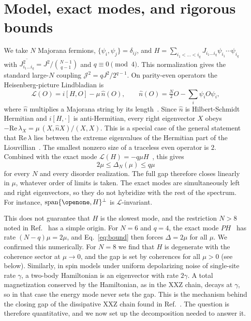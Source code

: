 \documentclass[aps,pre,twocolumn,superscriptaddress,amsmath,amssymb,10pt]{revtex4-2}
\newcommand{\Lc}{\mathcal{L}}
\newcommand{\J}{\mathcal{J}}
\begin{document}
\section{Model, exact modes, and rigorous bounds}

We take $N$ Majorana fermions, $\{\psi_i,\psi_j\}=\delta_{ij}$, and $H=\sum_{i_1<\dots<i_q}J_{i_1\dots i_q}\psi_{i_1}\cdots\psi_{i_q}$ with $\overline{J^2_{i_1\dots i_q}}=J^2/\binom{N-1}{q-1}$ and $q\equiv0 \pmod 4$. This normalization gives the standard large-$N$ coupling $\J^2=qJ^2/2^{q-1}$. On parity-even operators the Heisenberg-picture Lindbladian is
\begin{equation}
\Lc(O)=i[H,O]-\mu\,\hat n(O),\qquad \hat n(O)=\tfrac N2O-\sum_i\psi_iO\psi_i,
\label{eq:L}
\end{equation}
where $\hat n$ multiplies a Majorana string by its length~\cite{Schuster2023,Bhattacharjee2023,Liu2024}. Since $\hat n$ is Hilbert-Schmidt Hermitian and $i[H,\cdot]$ is anti-Hermitian, every right eigenvector $X$ obeys $-\mathrm{Re}\,\lambda_X=\mu\,(X,\hat nX)/(X,X)$. This is a special case of the general statement that $\mathrm{Re}\,\lambda$ lies between the extreme eigenvalues of the Hermitian part of the Liouvillian~\cite{Barthel2022}. The smallest nonzero size of a traceless even operator is $2$. Combined with the exact mode $\Lc(H)=-q\mu H$~\cite{Garcia2026}, this gives
\begin{equation}
2\mu\le\Delta_N(\mu)\le q\mu
\label{eq:bound}
\end{equation}
for every $N$ and every disorder realization. The full gap therefore closes linearly in $\mu$, whatever order of limits is taken. The exact modes are simultaneously left and right eigenvectors, so they do not hybridize with the rest of the spectrum. For instance, $\mathrm{span}\{\openone,H\}^\perp$ is $\Lc$-invariant.

This does not guarantee that $H$ is the slowest mode, and the restriction $N>8$ noted in Ref.~\cite{Garcia2023} has a simple origin. For $N=6$ and $q=4$, the exact mode $PH$~\cite{Garcia2026} has rate $(N-q)\mu=2\mu$, and Eq.~\eqref{eq:bound} then forces $\Delta=2\mu$ for all $\mu$. We confirmed this numerically. For $N=8$ we find that $H$ is degenerate with the coherence sector at $\mu\to0$, and the gap is set by coherences for all $\mu>0$ (see below). Similarly, in spin models under uniform depolarizing noise of single-site rate $\gamma$, a two-body Hamiltonian is an eigenvector with rate $2\gamma$. A total magnetization conserved by the Hamiltonian, as in the XXZ chain, decays at $\gamma$, so in that case the energy mode never sets the gap. This is the mechanism behind the closing gap of the dissipative XXZ chain found in Ref.~\cite{Cai2013}. The question is therefore quantitative, and we now set up the decomposition needed to answer it.
\end{document}
